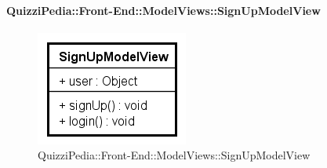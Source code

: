 \paragraph{QuizziPedia::Front-End::ModelViews::SignUpModelView}
	
	\label{QuizziPedia::Front-End::ModelViews::SignUpModelView}
	
	\begin{figure}[ht]
		\centering
		\includegraphics[scale=0.80,keepaspectratio]{UML/Classi/Front-End/QuizziPedia_Front-end_ModelView_SignUpModelView.png}
		\caption{QuizziPedia::Front-End::ModelViews::SignUpModelView}
	\end{figure} \FloatBarrier
	
